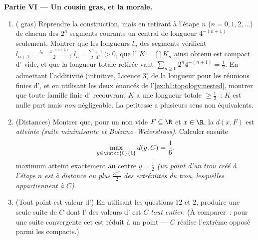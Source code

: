 \begin{problem}[{Devoir maison --- l'\omterm{def:b1:logic:sets}{ensemble} triadique de Cantor~:
longueur nulle, non dénombrable, parfait, et $C + C =
\intcc{0}{2}$}]
\medskip
\noindent\textbf{Partie VI --- Un cousin gras, et la morale.}
\begin{enumerate}[resume]
  \item ( gras) Reprendre la construction, mais
        en retirant à l'étape $n$ ($n = 0, 1, 2, \dots$) de
        chacun des $2^n$ segments courants un  
        central de longueur $4^{-(n+1)}$ seulement. Montrer que
        les longueurs $l_n$ des segments vérifient
        $l_{n+1} = \frac{l_n - 4^{-(n+1)}}{2}$, $l_n =
        \frac{2^n + 1}{2\cdot 4^n} > 0$, que l'
        $K = \bigcap K_n$ ainsi obtenu est compact d'
        vide, et que la longueur totale retirée vaut
        $\sum_{n\geq0} 2^n 4^{-(n+1)} = \frac12$. En admettant
        l'additivité (intuitive, Licence 3) de la longueur pour
        les réunions finies d', et en utilisant les
        deux énoncés de l'\cref{ex:b1:topology:nested}, montrer que
        toute famille finie d'  recouvrant $K$
        a une longueur totale $\geq \frac12$~: $K$ est nulle part
         mais \emph{non} négligeable. La petitesse a
        plusieurs sens non équivalents.
  \item (Distances) Montrer que, pour un  non vide $F \subseteq
        \R$ et $x \in \R$, la  $d(x, F)$ est
        \emph{atteinte} \emph{(suite minimisante et
        Bolzano--Weierstrass)}. Calculer ensuite
        \[
        \max_{y \in \intcc{0}{1}} d(y, C) = \frac16 ,
        \]
        maximum atteint exactement au centre $y = \frac12$ \emph{(un
        point d'un trou créé à l'étape $n$ est à distance au plus
        $\frac{3^{-n}}{2}$ des extrémités du trou, lesquelles
        appartiennent à $C$)}.
  \item (Tout point est valeur d') En utilisant les
        questions 12 et 2, produire une seule suite de $C$ dont
        l' des valeurs d' est $C$ \emph{tout
        entier}. (À comparer~: pour une suite convergente cet
         est réduit à un point --- $C$ réalise l'extrême
        opposé parmi les compacts.)

\end{enumerate}
\end{problem}
